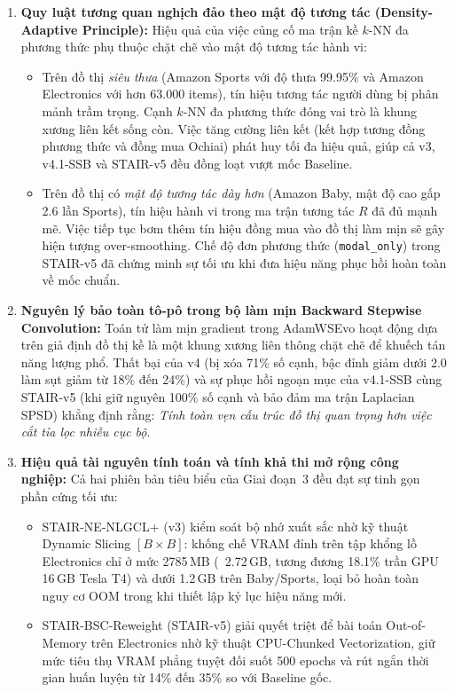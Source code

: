 \begin{enumerate}
    \item \textbf{Quy luật tương quan nghịch đảo theo mật độ tương tác (Density-Adaptive Principle):}
    Hiệu quả của việc củng cố ma trận kề $k$-NN đa phương thức phụ thuộc chặt chẽ vào mật độ tương tác hành vi:
    \begin{itemize}
        \item Trên đồ thị \textit{siêu thưa} (Amazon Sports với độ thưa 99.95\% và Amazon Electronics với hơn 63.000 items), tín hiệu tương tác người dùng bị phân mảnh trầm trọng. Cạnh $k$-NN đa phương thức đóng vai trò là khung xương liên kết sống còn. Việc tăng cường liên kết (kết hợp tương đồng phương thức và đồng mua Ochiai) phát huy tối đa hiệu quả, giúp cả v3, v4.1-SSB và STAIR-v5 đều đồng loạt vượt mốc Baseline.
        \item Trên đồ thị có \textit{mật độ tương tác dày hơn} (Amazon Baby, mật độ cao gấp 2.6 lần Sports), tín hiệu hành vi trong ma trận tương tác $R$ đã đủ mạnh mẽ. Việc tiếp tục bơm thêm tín hiệu đồng mua vào đồ thị làm mịn sẽ gây hiện tượng over-smoothing. Chế độ đơn phương thức (\texttt{modal\_only}) trong STAIR-v5 đã chứng minh sự tối ưu khi đưa hiệu năng phục hồi hoàn toàn về mốc chuẩn.
    \end{itemize}

    \item \textbf{Nguyên lý bảo toàn tô-pô trong bộ làm mịn Backward Stepwise Convolution:}
    Toán tử làm mịn gradient trong AdamWSEvo hoạt động dựa trên giả định đồ thị kề là một khung xương liên thông chặt chẽ để khuếch tán năng lượng phổ. Thất bại của v4 (bị xóa 71\% số cạnh, bậc đỉnh giảm dưới 2.0 làm sụt giảm từ 18\% đến 24\%) và sự phục hồi ngoạn mục của v4.1-SSB cùng STAIR-v5 (khi giữ nguyên 100\% số cạnh và bảo đảm ma trận Laplacian SPSD) khẳng định rằng: \textit{Tính toàn vẹn cấu trúc đồ thị quan trọng hơn việc cắt tỉa lọc nhiễu cục bộ}.

    \item \textbf{Hiệu quả tài nguyên tính toán và tính khả thi mở rộng công nghiệp:}
    Cả hai phiên bản tiêu biểu của Giai đoạn~3 đều đạt sự tinh gọn phần cứng tối ưu:
    \begin{itemize}
        \item STAIR-NE-NLGCL+ (v3) kiểm soát bộ nhớ xuất sắc nhờ kỹ thuật Dynamic Slicing $[B \times B]$: khống chế VRAM đỉnh trên tập khổng lồ Electronics chỉ ở mức 2785\,MB (~2.72\,GB, tương đương 18.1\% trần GPU 16\,GB Tesla T4) và dưới 1.2\,GB trên Baby/Sports, loại bỏ hoàn toàn nguy cơ OOM trong khi thiết lập kỷ lục hiệu năng mới.
        \item STAIR-BSC-Reweight (STAIR-v5) giải quyết triệt để bài toán Out-of-Memory trên Electronics nhờ kỹ thuật CPU-Chunked Vectorization, giữ mức tiêu thụ VRAM phẳng tuyệt đối suốt 500 epochs và rút ngắn thời gian huấn luyện từ 14\% đến 35\% so với Baseline gốc.
    \end{itemize}
\end{enumerate}

\clearpage